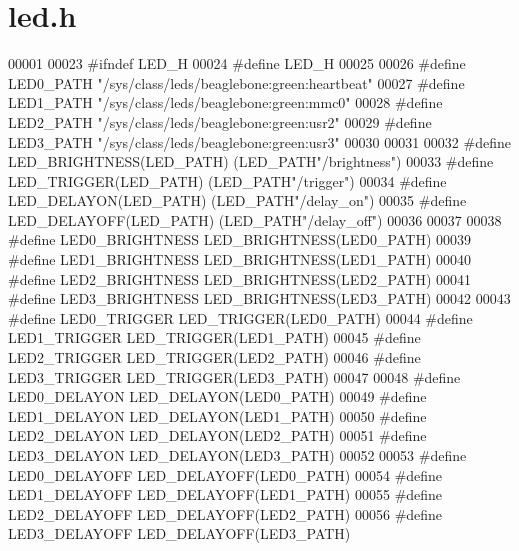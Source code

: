\hypertarget{led_8h_source}{}\section{led.\+h}
\label{led_8h_source}

\begin{DoxyCode}
00001 
00023 \textcolor{preprocessor}{#ifndef  LED\_H}
00024 \textcolor{preprocessor}{#define  LED\_H}
00025 
00026 \textcolor{preprocessor}{#define LED0\_PATH    "/sys/class/leds/beaglebone:green:heartbeat"}
00027 \textcolor{preprocessor}{#define LED1\_PATH    "/sys/class/leds/beaglebone:green:mmc0"}
00028 \textcolor{preprocessor}{#define LED2\_PATH    "/sys/class/leds/beaglebone:green:usr2"}
00029 \textcolor{preprocessor}{#define LED3\_PATH    "/sys/class/leds/beaglebone:green:usr3"}
00030 
00031 
00032 \textcolor{preprocessor}{#define LED\_BRIGHTNESS(LED\_PATH) (LED\_PATH"/brightness") }
00033 \textcolor{preprocessor}{#define LED\_TRIGGER(LED\_PATH)    (LED\_PATH"/trigger") }
00034 \textcolor{preprocessor}{#define LED\_DELAYON(LED\_PATH)    (LED\_PATH"/delay\_on")}
00035 \textcolor{preprocessor}{#define LED\_DELAYOFF(LED\_PATH)   (LED\_PATH"/delay\_off")}
00036 
00037 
00038 \textcolor{preprocessor}{#define LED0\_BRIGHTNESS LED\_BRIGHTNESS(LED0\_PATH)}
00039 \textcolor{preprocessor}{#define LED1\_BRIGHTNESS LED\_BRIGHTNESS(LED1\_PATH)}
00040 \textcolor{preprocessor}{#define LED2\_BRIGHTNESS LED\_BRIGHTNESS(LED2\_PATH)}
00041 \textcolor{preprocessor}{#define LED3\_BRIGHTNESS LED\_BRIGHTNESS(LED3\_PATH)}
00042 
00043 \textcolor{preprocessor}{#define LED0\_TRIGGER LED\_TRIGGER(LED0\_PATH)}
00044 \textcolor{preprocessor}{#define LED1\_TRIGGER LED\_TRIGGER(LED1\_PATH)}
00045 \textcolor{preprocessor}{#define LED2\_TRIGGER LED\_TRIGGER(LED2\_PATH)}
00046 \textcolor{preprocessor}{#define LED3\_TRIGGER LED\_TRIGGER(LED3\_PATH)}
00047 
00048 \textcolor{preprocessor}{#define LED0\_DELAYON LED\_DELAYON(LED0\_PATH)}
00049 \textcolor{preprocessor}{#define LED1\_DELAYON LED\_DELAYON(LED1\_PATH)}
00050 \textcolor{preprocessor}{#define LED2\_DELAYON LED\_DELAYON(LED2\_PATH)}
00051 \textcolor{preprocessor}{#define LED3\_DELAYON LED\_DELAYON(LED3\_PATH)}
00052 
00053 \textcolor{preprocessor}{#define LED0\_DELAYOFF LED\_DELAYOFF(LED0\_PATH)}
00054 \textcolor{preprocessor}{#define LED1\_DELAYOFF LED\_DELAYOFF(LED1\_PATH)}
00055 \textcolor{preprocessor}{#define LED2\_DELAYOFF LED\_DELAYOFF(LED2\_PATH)}
00056 \textcolor{preprocessor}{#define LED3\_DELAYOFF LED\_DELAYOFF(LED3\_PATH)}

\end{DoxyCode}
